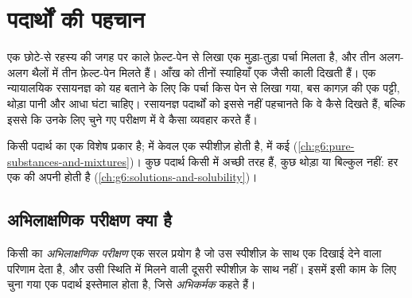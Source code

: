 \chapter{पदार्थों की पहचान}\label{ch:g7:identifying-substances}

एक छोटे-से रहस्य की जगह पर काले फ़ेल्ट-पेन से लिखा एक मुड़ा-तुड़ा पर्चा
मिलता है, और तीन अलग-अलग थैलों में तीन फ़ेल्ट-पेन मिलते हैं। आँख को तीनों
स्याहियाँ एक जैसी काली दिखती हैं। एक न्यायालयिक रसायनज्ञ को यह बताने के लिए
कि पर्चा किस पेन से लिखा गया, बस कागज़ की एक पट्टी, थोड़ा पानी और आधा घंटा
चाहिए। रसायनज्ञ पदार्थों को इससे नहीं पहचानते कि वे कैसे दिखते हैं, बल्कि
इससे कि उनके लिए चुने गए परीक्षण में वे कैसा व्यवहार करते हैं।

\begin{recall}
 किसी पदार्थ का एक विशेष प्रकार है;  में केवल
एक स्पीशीज़ होती है,  में कई
(\cref{ch:g6:pure-substances-and-mixtures})। कुछ पदार्थ किसी  में
अच्छी तरह  हैं, कुछ थोड़ा या बिल्कुल नहीं: हर एक की अपनी
 होती है (\cref{ch:g6:solutions-and-solubility})।
\end{recall}

\section{अभिलाक्षणिक परीक्षण क्या है}

\begin{definition}[अभिलाक्षणिक परीक्षण और अभिकर्मक]\label{def:g7:identifying-substances:characteristic-test}
किसी  का \emph{अभिलाक्षणिक परीक्षण}
एक सरल प्रयोग है जो उस स्पीशीज़ के साथ एक दिखाई देने वाला परिणाम देता है,
और उसी स्थिति में मिलने वाली दूसरी स्पीशीज़ के साथ नहीं। इसमें इसी काम के
लिए चुना गया एक पदार्थ इस्तेमाल होता है, जिसे
\emph{अभिकर्मक} कहते हैं।
\end{definition}


